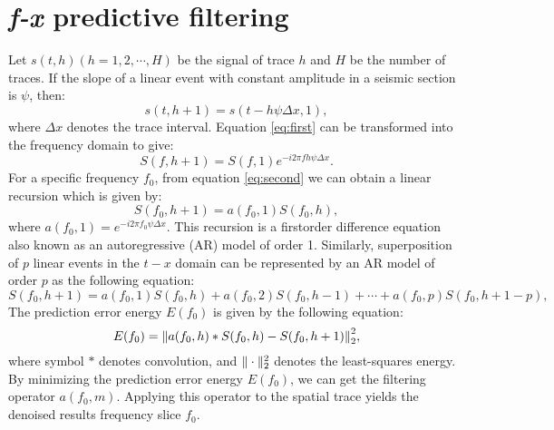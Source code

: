 \section{\emph{f-x} predictive filtering}
Let $s(t,h)(h=1,2,\cdots,H)$ be the signal of trace $h$ and $H$ be the number of traces. If the slope of a linear event with constant amplitude in a seismic section is $\psi$, then:
\begin{equation}
\label{eq:first}
s(t,h+1)=s(t-h\psi\Delta x,1),
\end{equation}
where $\Delta x$ denotes the trace interval. Equation \ref{eq:first} can be transformed into the frequency domain  to give:
\begin{equation}
\label{eq:second}
S(f,h+1)=S(f,1)e^{-i2\pi fh\psi\Delta x}.
\end{equation}
For a specific frequency $f_0$,  from equation \ref{eq:second} we can  obtain a linear recursion\wen{,} which is given by:
\begin{equation}
\label{eq:third}
S(f_0,h+1)=a(f_0,1)S(f_0,h),
\end{equation}
where  $a(f_0,1)=e^{-i2\pi f_0\psi\Delta x}$. 
This recursion is a first\wen{-}order difference equation\wen{,} also known as an auto\wen{-}regressive (AR) model of order 1. Similarly, superposition of $p$ linear events in the $t-x$ domain can be represented by an AR model of order $p$ \cite[]{tufts,har} as the following equation:
\begin{equation}
\label{eq:fifth}
S(f_0,h+1)=a(f_0,1)S(f_0,h)+a(f_0,2)S(f_0,h-1)+\cdots+a(f_0,p)S(f_0,h+1-p),
\end{equation}
 The prediction error energy $E(f_0)$ is given by the following equation:
\begin{equation}
\label{eq:sixth}
E(f_0)={\Arrowvert a(f_0,h) \ast S(f_0,h)-S(f_0,h+1) \Arrowvert}_2^2,
\end{equation}
where symbol $*$ denotes convolution, and $\Arrowvert\cdot\Arrowvert_2^2$ denotes the least-squares energy. By minimizing the prediction error energy $E(f_0)$, we can get the filtering operator $a(f_0,m)$. Applying this operator to the spatial trace yields the denoised results  frequency slice $f_0$.


